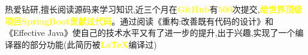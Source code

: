 

\begin{cvparagraph}

热爱钻研,擅长阅读源码来学习知识,近三个月在\textcolor{yellow}{\textbf{GitHub}}有\textcolor{yellow}{\textbf{500}}次提交,\textcolor{yellow}{\textbf{给世界顶级项目SpringBoot贡献过代码}}。通过阅读《重构:改善既有代码的设计》和《Effective Java》使自己的技术水平又有了进一步的提升,出于兴趣,实现了一个编译器的部分功能(此简历被\textcolor{yellow}{\textbf{LaTeX}}编译过)

\end{cvparagraph}


